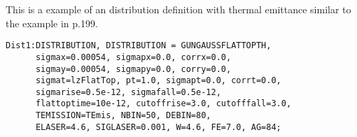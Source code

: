 This is a example of an \opal distribution definition with thermal emittance similar to the example in \cite{clen:2000} p.199.

\begin{verbatim}
Dist1:DISTRIBUTION, DISTRIBUTION = GUNGAUSSFLATTOPTH,
      sigmax=0.00054, sigmapx=0.0, corrx=0.0,
      sigmay=0.00054, sigmapy=0.0, corry=0.0,
      sigmat=lzFlatTop, pt=1.0, sigmapt=0.0, corrt=0.0,
      sigmarise=0.5e-12, sigmafall=0.5e-12, 
      flattoptime=10e-12, cutoffrise=3.0, cutofffall=3.0,
      TEMISSION=TEmis, NBIN=50, DEBIN=80,
      ELASER=4.6, SIGLASER=0.001, W=4.6, FE=7.0, AG=84;  

\end{verbatim}





